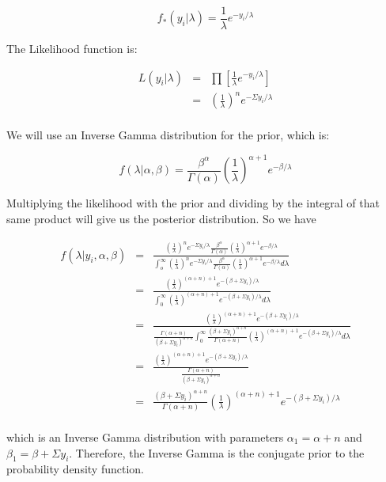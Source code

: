 \documentclass[12pt]{article}
\begin{document}
\[f_*(y_i|\lambda)=\frac{1}{\lambda}e^{-y_i/\lambda} \]

\noindent The Likelihood function is:

\begin{eqnarray*}
L(y_i|\lambda) &=& \prod\left[\frac{1}{\lambda}e^{-y_i/\lambda}\right] \\
&=& \left(\frac{1}{\lambda}\right)^ne^{-\Sigma y_i/\lambda} \\
\end{eqnarray*}

\noindent We will use an Inverse Gamma distribution for the prior, which is:

\[f(\lambda|\alpha,\beta)=\frac{\beta^\alpha}{\Gamma(\alpha)}\left(\frac{1}{\lambda}\right)^{\alpha+1}e^{-\beta/\lambda}\]

\noindent Multiplying the likelihood with the prior and dividing by the integral of that same product will give us the posterior distribution.  So we have

\begin{eqnarray*}
f(\lambda|y_i,\alpha,\beta) &=& \frac{\left(\frac{1}{\lambda}\right)^ne^{-\Sigma y_i/\lambda}\frac{\beta^\alpha}{\Gamma(\alpha)}\left(\frac{1}{\lambda}\right)^{\alpha+1}e^{-\beta/\lambda}}{\int_o^\infty \left(\frac{1}{\lambda}\right)^ne^{-\Sigma y_i/\lambda}\frac{\beta^\alpha}{\Gamma(\alpha)}\left(\frac{1}{\lambda}\right)^{\alpha+1}e^{-\beta/\lambda}d\lambda} \\
&=& \frac{\left(\frac{1}{\lambda}\right)^{(\alpha+n)+1}e^{-(\beta+\Sigma y_i)/\lambda}}{\int_0^\infty \left(\frac{1}{\lambda}\right)^{(\alpha+n)+1}e^{-(\beta+\Sigma y_i)/\lambda}d\lambda} \\
&=& \frac{\left(\frac{1}{\lambda}\right)^{(\alpha+n)+1}e^{-(\beta+\Sigma y_i)/\lambda}}{\frac{\Gamma(\alpha+n)}{(\beta+\Sigma y_i)^{\alpha+n}}\int_0^\infty \frac{(\beta+\Sigma y_i)^{\alpha+n}}{\Gamma(\alpha+n)}\left(\frac{1}{\lambda}\right)^{(\alpha+n)+1}e^{-(\beta+\Sigma y_i)/\lambda}d\lambda} \\
&=& \frac{\left(\frac{1}{\lambda}\right)^{(\alpha+n)+1}e^{-(\beta+\Sigma y_i)/\lambda}}{\frac{\Gamma(\alpha+n)}{(\beta+\Sigma y_i)^{\alpha+n}}} \\
&=& \frac{(\beta+\Sigma y_i)^{\alpha+n}}{\Gamma(\alpha+n)}\left(\frac{1}{\lambda}\right)^{(\alpha+n)+1}e^{-(\beta+\Sigma y_i)/\lambda} \\
\end{eqnarray*}

\noindent which is an Inverse Gamma distribution with parameters $\alpha_1=\alpha+n$ and $\beta_1=\beta+\Sigma y_i$.  Therefore, the Inverse Gamma is the conjugate prior to the probability density function.
\bigskip
\end{document}
